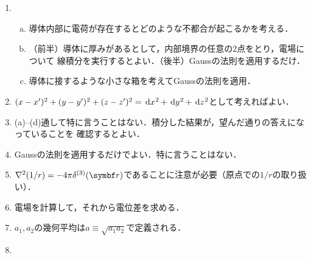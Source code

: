 \begin{enumerate}[label={1.\arabic*}]
  \item 
    \begin{enumerate}[(a)]
      \item 導体内部に電荷が存在するとどのような不都合が起こるかを考える．
      \item （前半）導体に厚みがあるとして，内部境界の任意の2点をとり，電場について
        線積分を実行するとよい．（後半）Gaussの法則を適用するだけ．
      \item 導体に接するような小さな箱を考えてGaussの法則を適用．
    \end{enumerate}
  \item $(x-x')^2 + (y-y')^2 + (z-z')^2 = \dl[2]{x} + \dl[2]{y} + \dl[2]{z}$として考えればよい．
  \item (a)--(d)通して特に言うことはない．積分した結果が，望んだ通りの答えになっていることを
    確認するとよい．
  \item Gaussの法則を適用するだけでよい．特に言うことはない．
  \item $\gr^2 (1/r) = -4\pi \delta^{(3)}(\bs{r})$であることに注意が必要（原点での$1/r$の取り扱い）．
  \item 電場を計算して，それから電位差を求める．
  \item $a_1, a_2$の幾何平均は$a \equiv \sqrt{a_1 a_2}$で定義される．
  \item 
\end{enumerate}

